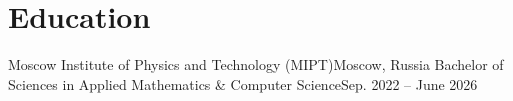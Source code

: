 \section{Education}
\resumeSubHeadingListStart
\resumeSubheading
{Moscow Institute of Physics and Technology (MIPT)}{Moscow, Russia}
{Bachelor of Sciences in Applied Mathematics \& Computer Science}{Sep. 2022 -- June 2026}
\resumeSubHeadingListEnd